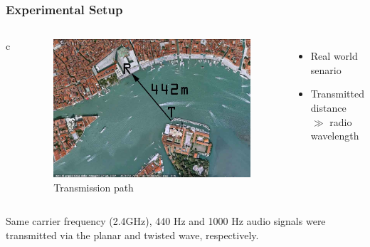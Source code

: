 \documentclass[xcolor=dvipsnames]{beamer}
\newenvironment{items}[1][]
{\begin{itemize}
    \ifthenelse{\isempty{#1}}
    {\setlength{\itemsep}{12pt}}{\setlength{\itemsep}{#1}}}
  {\end{itemize}}
\begin{document}
\begin{frame}
	\frametitle{Experimental Setup}
  \begin{columns}{c}
		\begin{figure}
      \includegraphics[width=\textwidth]{birdeyeview}
      \caption{Transmission path}
      \label{pic:birdeye}
		\end{figure}
		\begin{items}
		\item Real world senario
		\item Transmitted distance $\gg$ radio wavelength
		\end{items}
  \end{columns}
\end{frame}
\begin{frame}
Same carrier frequency (2.4GHz), 440 Hz and 1000 Hz audio signals were transmitted via the planar and twisted wave, respectively.
\end{frame}








\end{document}
